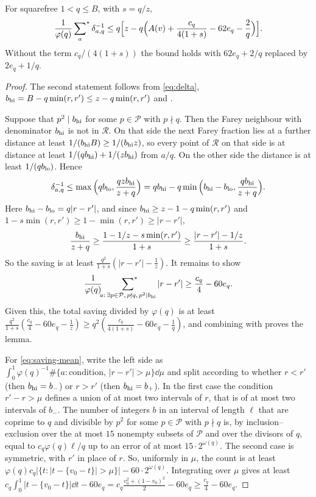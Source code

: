 \documentclass[11pt,colorlinks]{charlie}
\newcommand{\cR}{\mathcal R}
\newcommand{\cP}{\mathcal P}
\begin{document}
\begin{lemma}\label{lem:reduced}
For squarefree $1<q\le B$, with $s=q/z$,
\[
 \frac1{\varphi(q)}\sideset{}{^*}\sum_a\delta_{a,q}^{-1}\le q\Big[z-q\Big(A(v)+\frac{c_q}{4(1+s)}-62e_q-\frac2q\Big)\Big].
\]
Without the term $c_q/(4(1+s))$ the bound holds with $62e_q+2/q$ replaced by $2e_q+1/q$.
\end{lemma}
\begin{proof}
The second statement follows from \eqref{eq:delta}, $b_{\rm hi}=B-q\min(r,r')\le z-q\min(r,r')$ and .

Suppose that $p^2\mid b_{\rm hi}$ for some $p\in\cP$ with $p\nmid q$. Then the Farey neighbour with denominator $b_{\rm hi}$ is not in $\cR$. On that side the next Farey fraction lies at a further distance at least $1/(b_{\rm hi}B)\ge1/(b_{\rm hi}z)$, so every point of $\cR$ on that side is at distance at least $1/(qb_{\rm hi})+1/(zb_{\rm hi})$ from $a/q$. On the other side the distance is at least $1/(qb_{\rm lo})$. Hence
\[
 \delta_{a,q}^{-1}\le\max\Big(qb_{\rm lo},\frac{qzb_{\rm hi}}{z+q}\Big)=qb_{\rm hi}-q\min\Big(b_{\rm hi}-b_{\rm lo},\frac{qb_{\rm hi}}{z+q}\Big).
\]
Here $b_{\rm hi}-b_{\rm lo}=q|r-r'|$, and since $b_{\rm hi}\ge z-1-q\min(r,r')$ and $1-s\min(r,r')\ge1-\min(r,r')\ge|r-r'|$,
\[
 \frac{b_{\rm hi}}{z+q}\ge\frac{1-1/z-s\min(r,r')}{1+s}\ge\frac{|r-r'|-1/z}{1+s}.
\]
So the saving is at least $\frac{q^2}{1+s}(|r-r'|-\frac1z)$. It remains to show
\begin{equation}\label{eq:saving-mean}
 \frac1{\varphi(q)}\sideset{}{^*}\sum_{a:\,\exists p\in\cP,\,p\nmid q,\,p^2\mid b_{\rm hi}}|r-r'|\ge\frac{c_q}4-60e_q .
\end{equation}
Given this, the total saving divided by $\varphi(q)$ is at least $\frac{q^2}{1+s}(\frac{c_q}4-60e_q-\frac1z)\ge q^2(\frac{c_q}{4(1+s)}-60e_q-\frac1q)$, and combining with  proves the lemma.

For \eqref{eq:saving-mean}, write the left side as $\int_0^1\varphi(q)^{-1}\#\{a:\text{condition},\,|r-r'|>\mu\}\dd\mu$ and split according to whether $r<r'$ (then $b_{\rm hi}=b_-$) or $r>r'$ (then $b_{\rm hi}=b_+$). In the first case the condition $r'-r>\mu$ defines a union of at most two intervals of $r$, that is of at most two intervals of $b_-$. The number of integers $b$ in an interval of length $\ell$ that are coprime to $q$ and divisible by $p^2$ for some $p\in\cP$ with $p\nmid q$ is, by inclusion--exclusion over the at most $15$ nonempty subsets of $\cP$ and over the divisors of $q$, equal to $c_q\varphi(q)\ell/q$ up to an error of at most $15\cdot2^{\omega(q)}$. The second case is symmetric, with $r'$ in place of $r$. So, uniformly in $\mu$, the count is at least $\varphi(q)c_q|\{t:|t-\{v_0-t\}|>\mu\}|-60\cdot2^{\omega(q)}$. Integrating over $\mu$ gives at least $c_q\int_0^1|t-\{v_0-t\}|\dd t-60e_q=c_q\frac{v_0^2+(1-v_0)^2}2-60e_q\ge\frac{c_q}4-60e_q$.
\end{proof}
\end{document}
